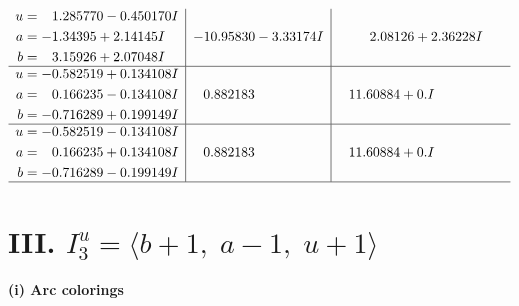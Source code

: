 \documentclass[1p]{elsarticle_modified}
\theoremstyle{definition}
\begin{document}
$$\begin{array}{c|c|c}
\begin{aligned}
u &= \phantom{-}1.285770 - 0.450170 I \\
a &= -1.34395 + 2.14145 I \\
b &= \phantom{-}3.15926 + 2.07048 I\end{aligned}
 & -10.95830 - 3.33174 I & \phantom{-}2.08126 + 2.36228 I \\ \hline\begin{aligned}
u &= -0.582519 + 0.134108 I \\
a &= \phantom{-}0.166235 - 0.134108 I \\
b &= -0.716289 + 0.199149 I\end{aligned}
 & \phantom{-}0.882183\phantom{ +0.000000I} & \phantom{-}11.60884 + 0. I\phantom{ +0.000000I} \\ \hline\begin{aligned}
u &= -0.582519 - 0.134108 I \\
a &= \phantom{-}0.166235 + 0.134108 I \\
b &= -0.716289 - 0.199149 I\end{aligned}
 & \phantom{-}0.882183\phantom{ +0.000000I} & \phantom{-}11.60884 + 0. I\phantom{ +0.000000I}\\
 \hline 
 \end{array}$$\newpage\newpage\renewcommand{\arraystretch}{1}
\centering \section*{III. $I^u_{3}= \langle b+1,\;a-1,\;u+1 \rangle$}
\flushleft \textbf{(i) Arc colorings}\\
\end{document}
